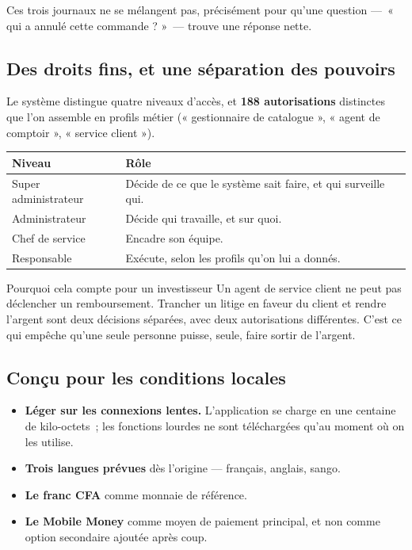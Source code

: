 \documentclass[11pt,a4paper]{article}
\begin{document}
Ces trois journaux ne se mélangent pas, précisément pour qu'une question
—~« qui a annulé cette commande ? »~— trouve une réponse nette.

\subsection{Des droits fins, et une séparation des pouvoirs}

Le système distingue quatre niveaux d'accès, et \textbf{188 autorisations}
distinctes que l'on assemble en profils métier (« gestionnaire de catalogue »,
« agent de comptoir », « service client »).

\begin{center}
\begin{tabularx}{\textwidth}{@{}l>{\raggedright\arraybackslash}X@{}}
\toprule
\textbf{Niveau} & \textbf{Rôle} \\
\midrule
Super administrateur & Décide de ce que le système sait faire, et qui surveille qui. \\
Administrateur & Décide qui travaille, et sur quoi. \\
Chef de service & Encadre son équipe. \\
Responsable & Exécute, selon les profils qu'on lui a donnés. \\
\bottomrule
\end{tabularx}
\end{center}

\begin{encadre}{Pourquoi cela compte pour un investisseur}
Un agent de service client ne peut pas déclencher un remboursement. Trancher
un litige en faveur du client et rendre l'argent sont deux décisions
séparées, avec deux autorisations différentes. C'est ce qui empêche qu'une
seule personne puisse, seule, faire sortir de l'argent.
\end{encadre}

\subsection{Conçu pour les conditions locales}

\begin{itemize}
  \item \textbf{Léger sur les connexions lentes.} L'application se charge en
        une centaine de kilo-octets~; les fonctions lourdes ne sont
        téléchargées qu'au moment où on les utilise.
  \item \textbf{Trois langues prévues} dès l'origine — français, anglais,
        sango.
  \item \textbf{Le franc CFA} comme monnaie de référence.
  \item \textbf{Le Mobile Money} comme moyen de paiement principal, et non
        comme option secondaire ajoutée après coup.
\end{itemize}
\end{document}
